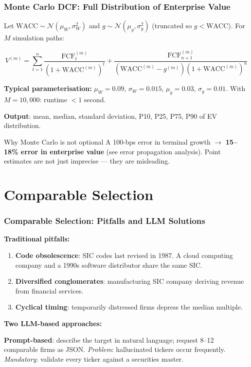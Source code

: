 \documentclass[9pt,t]{beamer}
\begin{document}
\begin{frame}
\frametitle{Monte Carlo DCF: Full Distribution of Enterprise Value}

Let $\text{WACC} \sim \mathcal{N}(\mu_W, \sigma_W^2)$ and $g \sim \mathcal{N}(\mu_g, \sigma_g^2)$
(truncated so $g < \text{WACC}$). For $M$ simulation paths:

\[
  V^{(m)} = \sum_{t=1}^{n}
  \frac{\text{FCF}_t^{(m)}}{(1+\text{WACC}^{(m)})^t}
  + \frac{\text{FCF}_{n+1}^{(m)}}{(\text{WACC}^{(m)}-g^{(m)})(1+\text{WACC}^{(m)})^n}
\]

\medskip
\textbf{Typical parameterisation:}
$\mu_W = 0.09$, $\sigma_W = 0.015$, $\mu_g = 0.03$, $\sigma_g = 0.01$.
With $M = 10{,}000$: runtime $< 1$ second.

\medskip
\textbf{Output}: mean, median, standard deviation, P10, P25, P75, P90 of EV distribution.

\medskip
\begin{block}{Why Monte Carlo is not optional}
A 100-bps error in terminal growth $\to$ \textbf{15--18\% error in enterprise value}
(see error propagation analysis). Point estimates are not just imprecise --- they are misleading.
\end{block}
\end{frame}

\section{Comparable Selection}

\begin{frame}
\frametitle{Comparable Selection: Pitfalls and LLM Solutions}

\textbf{Traditional pitfalls:}
\begin{enumerate}
  \item \textbf{Code obsolescence}: SIC codes last revised in 1987.
        A cloud computing company and a 1990s software distributor share the same SIC.
  \item \textbf{Diversified conglomerates}: manufacturing SIC company deriving revenue from financial services.
  \item \textbf{Cyclical timing}: temporarily distressed firms depress the median multiple.
\end{enumerate}

\medskip
\textbf{Two LLM-based approaches:}

\medskip
\textbf{Prompt-based}: describe the target in natural language; request 8--12 comparable firms as JSON.
\textit{Problem}: hallucinated tickers occur frequently.
\textit{Mandatory}: validate every ticker against a securities master.
\end{frame}
\end{document}
